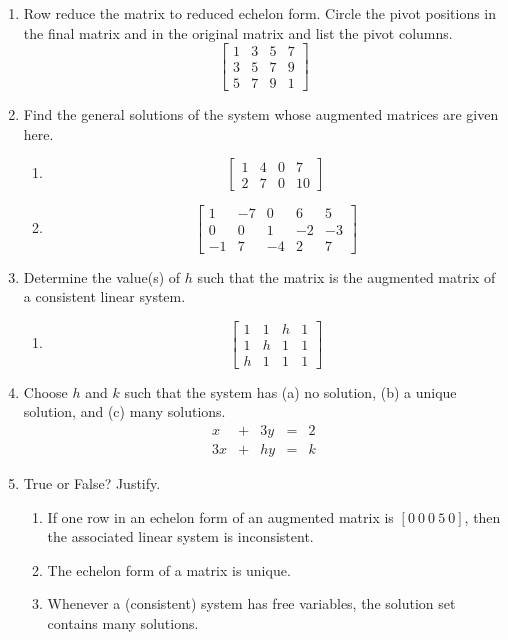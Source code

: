 \documentclass[12pt]{article}
\begin{document}
\begin{multicols*}{2}
\begin{enumerate}
		\item Row reduce the matrix to reduced echelon form. Circle the pivot positions in the final matrix and in the original matrix and list the pivot columns.
		\[
		\begin{bmatrix}
			1 & 3 & 5 & 7\\
			3 & 5 & 7 & 9\\
			5 & 7 & 9 & 1
		\end{bmatrix}
		\]
		\vfill

		\item Find the general solutions of the system whose augmented matrices are given here.
		\begin{enumerate}
			\item \[
			\begin{bmatrix}
				1 & 4 & 0 & 7\\
				2 & 7 & 0 & 10
			\end{bmatrix}
			\]
			\vfill
			\item \[
			\begin{bmatrix}
				1 & -7 & 0  & 6 & 5\\
				0 & 0 & 1 & -2 & -3\\
				-1 & 7 & -4 & 2 & 7
			\end{bmatrix}
			\]
			\vfill
		\end{enumerate}

		\item Determine the value(s) of $h$ such that the matrix is the augmented matrix of a consistent linear system.
		\begin{enumerate}
			\item 
			\[
			\begin{bmatrix}
				1 & 1 & h & 1\\
				1 & h & 1 & 1\\
				h & 1 & 1 & 1
			\end{bmatrix}
			\]
		\end{enumerate}
		\vfill\null\pagebreak

		\item Choose $h$ and $k$ such that the system has (a) no solution, (b) a unique solution, and (c) many solutions.
		\[
		\begin{array}{rcrcr}
			x & + & 3y & = & 2\\
			3x & + & hy & = & k
		\end{array}
		\]
		\vfill

		\item True or False? Justify.
		\begin{enumerate}
			\item If one row in an echelon form of an augmented matrix is $[0\ 0\ 0\ 5\ 0]$, then the associated linear system is inconsistent.
			\vfill
			\item The echelon form of a matrix is unique.
			\vfill
			\item Whenever a (consistent) system has free variables, the solution set contains many solutions.
			\vfill
		\end{enumerate}


\end{enumerate}
\end{multicols*}
\end{document}

